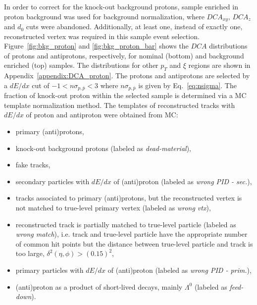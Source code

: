 In order to correct for the knock-out background protons, sample enriched in proton background  was used for background normalization, where $DCA_{xy}$, $DCA_z$ and $d_0$ cuts were abandoned. Additionally, at least one, instead of exactly one,  reconstructed vertex was required in this sample event selection.  Figure~\ref{fig:bkg_proton} and \ref{fig:bkg_proton_bar} shows the $DCA$ distributions of protons and antiprotons, respectively, for  nominal (bottom) and background enriched (top) samples.  The distributions for other $p_T$ and $\xi$ regions are shown in Appendix~\ref{appendix:DCA_proton}.
The protons and antiprotons are selected by a $dE/dx$ cut of $-1 < n\sigma_{p,\bar{p}} < 3$ where $n\sigma_{p,\bar{p}}$ is given by Eq.~\ref{eq:nsigma}. The fraction of knock-out proton within the selected sample is determined via a MC template normalization method. The templates of reconstructed tracks with $dE/dx$ of proton and antiproton were obtained from MC:
\begin{itemize}
	\item primary (anti)protons,
	\item knock-out background protons (labeled as \textit{dead-material}),
	\item fake tracks,
	\item secondary particles with $dE/dx$ of (anti)proton (labeled as \textit{wrong PID - sec.}),
	\item tracks associated to primary (anti)protons, but the reconstructed vertex is not matched to true-level primary vertex (labeled as \textit{wrong vtx}),
	\item reconstructed track is partially matched to true-level particle (labeled as \textit{wrong match}), i.e.  track and true-level particle have the appropriate number of common hit points but the distance between true-level particle and track is too large, $\delta^2\left(\eta,\phi\right)>\left(0.15\right)^2$,
	\item primary particles with $dE/dx$ of (anti)proton (labeled as \textit{wrong PID - prim.}),
	\item (anti)proton as a product of short-lived decays, mainly $\Lambda^0$ (labeled as \textit{feed-down}).
\end{itemize}

